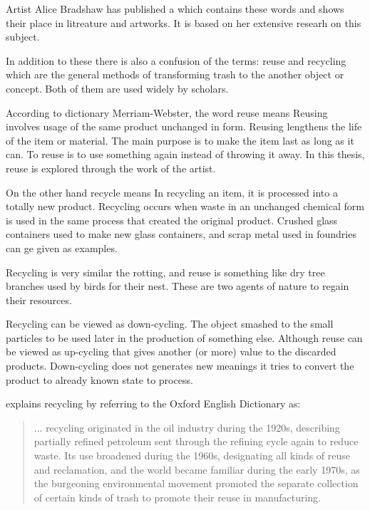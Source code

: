 Artist Alice Bradshaw has published a  which contains these words and shows their place in litreature and artworks. It is based on her extensive researh on this subject.

In addition to these there is also a confusion of the terms: reuse and recycling which are the general methods of transforming trash to the another object or concept. Both of them are used widely by scholars.

According to dictionary Merriam-Webster, the word reuse means  Reusing involves usage of the same product unchanged in form. Reusing lengthens the life of the item or material. The main purpose is to make the item last as long as it can. To reuse is to use something again instead of throwing it away. In this thesis, reuse is explored through the work of the artist.

On the other hand recycle means  In recycling an item, it is processed into a totally new product. Recycling occurs when waste in an unchanged chemical form is used in the same process that created the original product. Crushed glass containers used to make new glass containers, and scrap metal used in foundries can ge given as examples.

Recycling is very similar the rotting, and reuse is something like dry tree branches used by birds for their nest. These are two agents of nature to regain their resources.

Recycling can be viewed as down-cycling. The object smashed to the small particles to be used later in the production of something else. Although reuse can be viewed as up-cycling that gives another (or more) value to the discarded products. Down-cycling does not generates new meanings it tries to convert the product to already known state to process. 

\cite[72]{strasser1999waste} explains recycling by referring to the Oxford English Dictionary as:
\begin{quote}
... recycling originated in the oil industry during the 1920s, describing partially refined petroleum sent through the refining cycle again to reduce waste. Its use broadened during the 1960s, designating all kinds of reuse and reclamation, and the world became familiar during the early 1970s, as the burgeoning environmental movement promoted the separate collection of certain kinds of trash to promote their reuse in manufacturing.
\end{quote}

